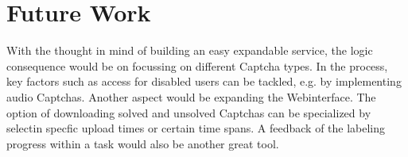 \section{Future Work}
\label{sec:future_work}

With the thought in mind of building an easy expandable service, the logic consequence would be on focussing on different Captcha types. In the process, key factors such as access for disabled users can be tackled, e.g. by implementing audio Captchas.
Another aspect would be expanding the Webinterface. The option of downloading solved and unsolved Captchas can be specialized by selectin specfic upload times or certain time spans. A feedback of the labeling progress within a task would also be another great tool.



\clearpage